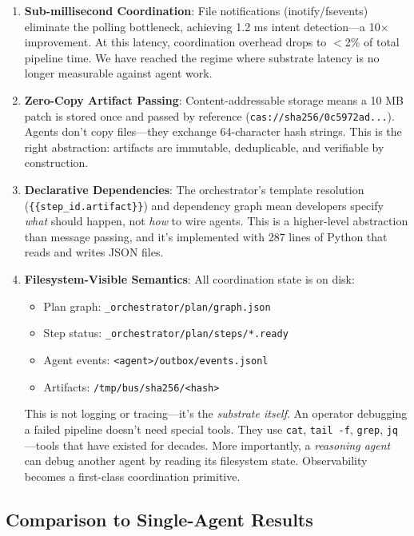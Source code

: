 \documentclass[11pt]{article}
\begin{document}
\begin{enumerate}
\item \textbf{Sub-millisecond Coordination}: File notifications (inotify/fsevents) eliminate the polling bottleneck, achieving 1.2 ms intent detection---a 10$\times$ improvement. At this latency, coordination overhead drops to $<$2\% of total pipeline time. We have reached the regime where substrate latency is no longer measurable against agent work.

\item \textbf{Zero-Copy Artifact Passing}: Content-addressable storage means a 10 MB patch is stored once and passed by reference (\texttt{cas://sha256/0c5972ad...}). Agents don't copy files---they exchange 64-character hash strings. This is the right abstraction: artifacts are immutable, deduplicable, and verifiable by construction.

\item \textbf{Declarative Dependencies}: The orchestrator's template resolution (\texttt{\{\{step\_id.artifact\}\}}) and dependency graph mean developers specify \emph{what} should happen, not \emph{how} to wire agents. This is a higher-level abstraction than message passing, and it's implemented with 287 lines of Python that reads and writes JSON files.

\item \textbf{Filesystem-Visible Semantics}: All coordination state is on disk:
\begin{itemize}
\item Plan graph: \texttt{\_orchestrator/plan/graph.json}
\item Step status: \texttt{\_orchestrator/plan/steps/*.ready}
\item Agent events: \texttt{<agent>/outbox/events.jsonl}
\item Artifacts: \texttt{/tmp/bus/sha256/<hash>}
\end{itemize}

This is not logging or tracing---it's the \emph{substrate itself}. An operator debugging a failed pipeline doesn't need special tools. They use \texttt{cat}, \texttt{tail -f}, \texttt{grep}, \texttt{jq}---tools that have existed for decades. More importantly, a \emph{reasoning agent} can debug another agent by reading its filesystem state. Observability becomes a first-class coordination primitive.
\end{enumerate}

\subsection{Comparison to Single-Agent Results}
\end{document}

